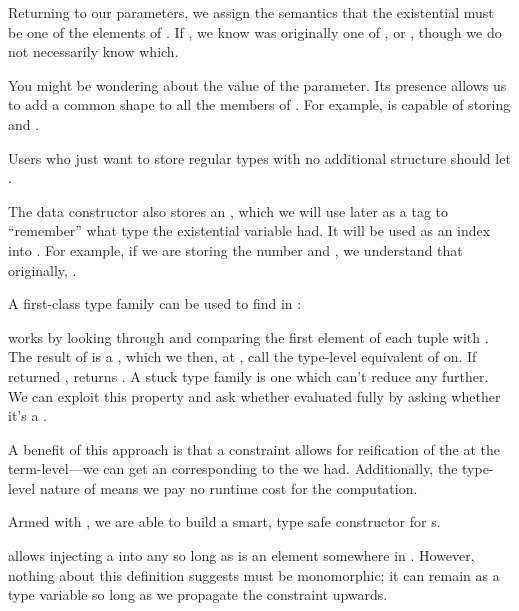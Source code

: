 \documentclass[book.tex]{subfiles}
\begin{document}
Returning to our parameters, we assign the semantics that the existential 
must be one of the elements of . If ,
we know  was originally one of ,  or , though
we do not necessarily know which.

You might be wondering about the value of the  parameter. Its presence
allows us to add a common shape to all the members of . For example,
 is capable of storing 
and .

Users who just want to store regular types with no additional structure should
let .

The  data constructor also stores an , which we will use
later as a tag to ``remember'' what type the existential variable  had. It
will be used as an index into . For example, if we are storing the number
 and , we understand that originally, .

A first-class type family can be used to find  in :


 works by looking through  and comparing the first element
of each tuple with . The result of  is a ,
which we then, at , call the type-level equivalent of  on.
If  returned ,  returns . A
stuck type family is one which can't reduce any further. We can exploit this
property and ask whether  evaluated fully by asking whether it's
a .


A benefit of this approach is that a  constraint allows for
reification of the  at the term-level---we can get an 
corresponding to the  we had. Additionally, the type-level nature of
 means we pay no runtime cost for the computation.


Armed with , we are able to build a smart, type safe constructor
for s.


 allows injecting a  into any  so long as
 is an element somewhere in . However, nothing about this
definition suggests  must be monomorphic; it can remain as a type
variable so long as we propagate the  constraint upwards.
\end{document}

